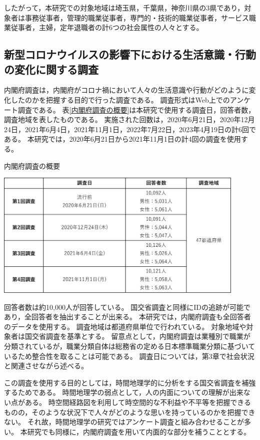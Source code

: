 \documentclass[paper={210mm,297mm},fontsize=15Q,line_length=35zw,number_of_lines=31,head_space=30mm,gutter=40mm,baselineskip=2.0zw,headfoot_verticalposition=1.5zw]{jlreq}
\begin{document}
したがって，本研究での対象地域は埼玉県，千葉県，神奈川県の3県であり，対象者は事務従事者，管理的職業従事者，専門的・技術的職業従事者，サービス職業従事者，主婦，定年退職者の計6つの社会属性の人々とする。

\subsection{新型コロナウイルスの影響下における生活意識・行動の変化に関する調査}

内閣府調査は，内閣府がコロナ禍において人々の生活意識や行動がどのように変化したのかを把握する目的で行った調査である。
調査形式はWeb上でのアンケート調査である。
表\ref{内閣府調査の概要}は本研究で使用する調査日，回答者数，調査地域を表したものである。
実施された回数は，2020年6月21日，2020年12月24日，2021年6月4日，2021年11月1日，2022年7月22日，2023年4月19日の計6回である。
本研究では，2020年6月21日から2021年11月1日の計4回の調査を使用する。

\begin{table}[H]
  \caption{内閣府調査の概要}
  \centering
  \includegraphics[width=120mm]{../Figure/c02s02_table_内閣府調査の概要.png}
  \label{内閣府調査の概要}
\end{table}

回答者数は約10,000人が回答している。
国交省調査と同様にIDの追跡が可能であり，全回答者を抽出することが出来る。
本研究では，内閣府調査も全回答者のデータを使用する。
調査地域は都道府県単位で行われている。
対象地域や対象者は国交省調査を基準とする。
留意点として，内閣府調査は業種別で職業が分類されているが，職業分類自体は総務省の定める日本標準職業分類に基づいているため整合性を取ることは可能である。
調査日については，第3章で社会状況と関連させながら述べる。

この調査を使用する目的としては，時間地理学的に分析をする国交省調査を補強するためである。
時間地理学の弱点として，人の内面についての理解が出来ない点がある。
時空間経路図を利用して時空間的な不利益や不平等を把握できるものの，そのような状況下で人々がどのような思いを持っているのかを把握できない。
それ故，時間地理学の研究ではアンケート調査と組み合わせることが多い。
本研究でも同様に，内閣府調査を用いて内面的な部分を補うこととする。
\end{document}
